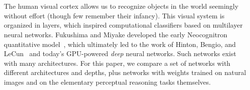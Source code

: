 %
\\~\\
 The human visual cortex allows us to recognize objects in the world seemingly without effort (though few remember their infancy). This visual system is organized in layers, which inspired computational classifiers based on multilayer neural networks. Fukushima and Miyake developed the early Neocognitron quantitative model~\cite{fukushima1982neocognitron}, which ultimately led to the work of Hinton, Bengio, and LeCun~\cite{lecun2015deep} and today's GPU-powered \emph{deep} neural networks. Such networks exist with many architectures. For this paper, we compare a set of networks with different architectures and depths, plus networks with weights trained on natural images and on the elementary perceptual reasoning tasks themselves.



